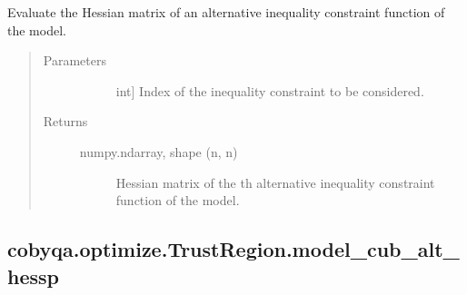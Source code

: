 \documentclass[letterpaper,10pt,english]{sphinxmanual}
\begin{document}
\begin{fulllineitems}
\begin{fulllineitems}
\label{\detokenize{refs/generated/cobyqa.optimize.TrustRegion.model_cub_alt_hess:cobyqa.optimize.TrustRegion.model_cub_alt_hess}}
\sphinxAtStartPar
Evaluate the Hessian matrix of an alternative inequality constraint
function of the model.
\begin{quote}\begin{description}
\item[{Parameters}] \leavevmode\begin{description}
\item[{}] \leavevmode{[}int{]}
\sphinxAtStartPar
Index of the inequality constraint to be considered.

\end{description}

\item[{Returns}] \leavevmode\begin{description}
\item[{numpy.ndarray, shape (n, n)}] \leavevmode
\sphinxAtStartPar
Hessian matrix of the \sphinxhyphen{}th alternative inequality constraint
function of the model.

\end{description}

\end{description}\end{quote}

\end{fulllineitems}



\subsection{cobyqa.optimize.TrustRegion.model\_cub\_alt\_hessp}
\label{\detokenize{refs/generated/cobyqa.optimize.TrustRegion.model_cub_alt_hessp:cobyqa-optimize-trustregion-model-cub-alt-hessp}}\label{\detokenize{refs/generated/cobyqa.optimize.TrustRegion.model_cub_alt_hessp::doc}}


\end{fulllineitems}
\end{document}
